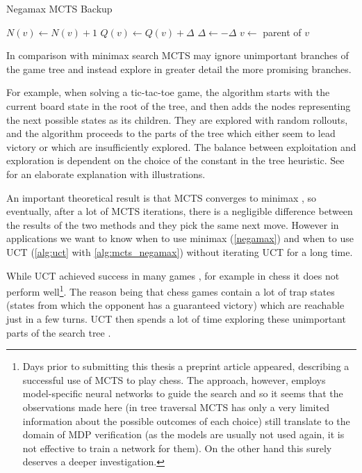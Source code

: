 \begin{algorithm}
\caption{Negamax MCTS Backup}
\label{alg:mcts_negamax}
\begin{algorithmic}
        \State $N(v) \gets N(v) + 1$
        \State $Q(v) \gets Q(v) + \Delta$
        \State $\Delta \gets - \Delta$
        \State $v \gets $ parent of $v$
    \EndWhile
\EndFunction
\end{algorithmic}
\end{algorithm}


In comparison with minimax search MCTS may ignore unimportant
branches of the game tree and instead explore in greater detail the more
promising branches.

For example, when solving a tic-tac-toe game, the algorithm starts with
the current board state in the root of the tree, and then adds
the nodes representing the next possible states as its children.
They are explored with random rollouts, and the algorithm proceeds to
the parts of the tree which either seem to lead victory or which are
insufficiently explored. The balance between exploitation and
exploration is dependent on the choice of the constant in the tree
heuristic. See \parencite{mcts_ttt} for an elaborate explanation with
illustrations.

An important theoretical result is
that MCTS converges to minimax \parencite{Kocsis},
so eventually, after a lot of MCTS iterations, there is a negligible
difference between the results of the two methods and they pick the same
next move. However in
applications we want to know when to use minimax (\autoref{negamax}) and
when to use UCT (\autoref{alg:uct} with \autoref{alg:mcts_negamax}) without
iterating UCT for a long time.

While UCT achieved success in many games \parencite{mcts_survey},
for example in chess it does not perform well\footnote{
    Days prior to submitting this thesis a preprint article
    \parencite{alphazero} appeared,
describing a successful use of MCTS to play chess. The approach,
however, employs model-specific neural networks to guide the search and
so it seems that the observations made here (in tree traversal MCTS has
only a very limited information about the possible outcomes of each
choice) still translate to the domain of MDP
verification (as the models are usually not used again, it is not
effective to train a network for them). On the other hand this surely
deserves a deeper investigation.}. The reason being that chess
games contain a lot of trap states (states from which the opponent
has a guaranteed victory) which are reachable just in a few turns. UCT
then spends a lot of time exploring these unimportant parts of the search
tree \parencite{mcts_vs_chess}.

